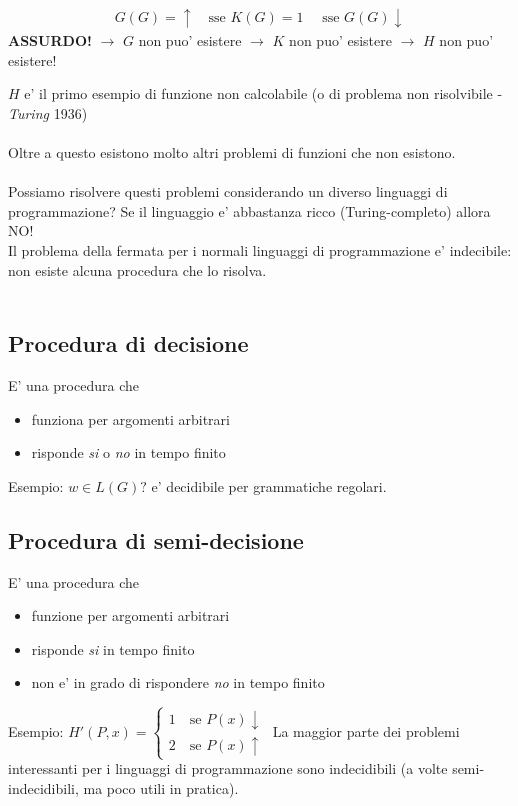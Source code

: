 \documentclass[a4paper,12pt]{article}
\begin{document}
{\begin{itemize}
\begin{align*}
    G(G)=\uparrow \quad \text{sse } K(G)=1 \quad \text{ sse } G(G)\downarrow
  \end{align*}
  \textbf{ASSURDO!} $\to$ $G$ non puo' esistere $\to$ $K$ non puo' esistere $\to$ $H$ non puo' esistere!
\end{itemize}
$H$ e' il primo esempio di funzione non calcolabile (o di problema non risolvibile - \textit{Turing} 1936) \\
\vspace{1em}\\
Oltre a questo esistono molto altri problemi di funzioni che non esistono. \\
\vspace{1em}\\
Possiamo risolvere questi problemi considerando un diverso linguaggi di programmazione? Se il linguaggio e' abbastanza ricco (Turing-completo) allora NO! \\
Il problema della fermata per i normali linguaggi di programmazione e' indecibile: non esiste alcuna procedura che lo risolva. \\
\vspace{1em} \\
\subsection{Procedura di decisione}
E' una procedura che
\begin{itemize}
  \item funziona per argomenti arbitrari
  \item risponde \textit{si} o \textit{no} in tempo finito
\end{itemize}
Esempio: $w \in L(G)?$ e' decidibile per grammatiche regolari.
\subsection{Procedura di semi-decisione}
E' una procedura che
\begin{itemize}
  \item funzione per argomenti arbitrari
  \item risponde \textit{si} in tempo finito
  \item non e' in grado di rispondere \textit{no} in tempo finito
\end{itemize}
Esempio: $H'(P, x) = \begin{cases}
  1 \quad \text{se } P(x) \downarrow \\
  2 \quad \text{se } P(x) \uparrow
\end{cases}$
\vspace{1em}
La maggior parte dei problemi interessanti per i linguaggi di programmazione sono indecidibili (a volte semi-indecidibili, ma poco utili in pratica). \\
\vspace{1em}\\
}
\end{document}
